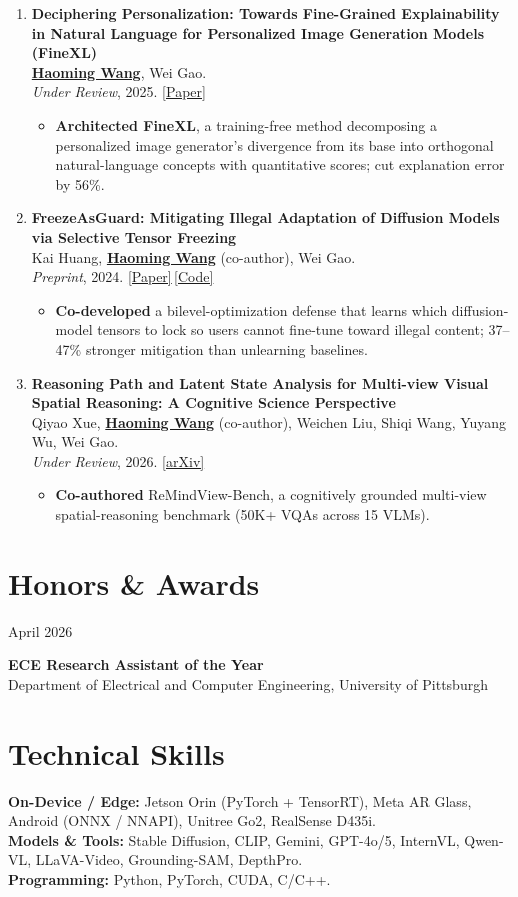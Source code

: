 \documentclass[11pt, letterpaper]{article}
\newenvironment{datedentry}[1]{%
  \par\noindent
  \begin{minipage}[t]{2.8cm}\raggedright\small #1\end{minipage}%
  \hspace{0.3cm}%
  \begin{minipage}[t]{\dimexpr\linewidth-3.1cm\relax}\raggedright
}{\end{minipage}\par\medskip}
\newenvironment{publist}{
  \begin{enumerate}[leftmargin=1.7em, itemsep=4pt, parsep=0pt, topsep=2pt, label=\arabic*.]
}{\end{enumerate}}
\newcommand{\impactbullet}[1]{%
  \par\vspace{1pt}%
  \begin{itemize}[leftmargin=1.2em, topsep=0pt, itemsep=0pt, parsep=0pt, partopsep=0pt]
    \item #1
  \end{itemize}}
\newcommand{\me}{\underline{\textbf{Haoming Wang}}}
\newcommand{\meco}{\underline{\textbf{Haoming Wang}} (co-author)}
\begin{document}
\begin{publist}
\item \textbf{Deciphering Personalization: Towards Fine-Grained Explainability in Natural Language for Personalized Image Generation Models (FineXL)}\\
\me, Wei Gao.\\
\textit{Under Review}, 2025. \href{https://haomingwang645.github.io/pdfs/finexl_paper.pdf}{[Paper]}
\impactbullet{\textbf{Architected FineXL}, a training-free method decomposing a personalized image generator's divergence from its base into orthogonal natural-language concepts with quantitative scores; cut explanation error by 56\%.}

\item \textbf{FreezeAsGuard: Mitigating Illegal Adaptation of Diffusion Models via Selective Tensor Freezing}\\
Kai Huang, \meco, Wei Gao.\\
\textit{Preprint}, 2024. \href{https://haomingwang645.github.io/pdfs/freezeasguard_paper.pdf}{[Paper]}\,\href{https://github.com/pittisl/FreezeAsGuard}{[Code]}
\impactbullet{\textbf{Co-developed} a bilevel-optimization defense that learns which diffusion-model tensors to lock so users cannot fine-tune toward illegal content; 37--47\% stronger mitigation than unlearning baselines.}

\item \textbf{Reasoning Path and Latent State Analysis for Multi-view Visual Spatial Reasoning: A Cognitive Science Perspective}\\
Qiyao Xue, \meco, Weichen Liu, Shiqi Wang, Yuyang Wu, Wei Gao.\\
\textit{Under Review}, 2026. \href{https://arxiv.org/abs/2512.02340}{[arXiv]}
\impactbullet{\textbf{Co-authored} ReMindView-Bench, a cognitively grounded multi-view spatial-reasoning benchmark (50K+ VQAs across 15 VLMs).}
\end{publist}

\section{Honors \& Awards}

\begin{datedentry}{April 2026}
\textbf{ECE Research Assistant of the Year}\\
Department of Electrical and Computer Engineering, University of Pittsburgh
\end{datedentry}

\section{Technical Skills}
\textbf{On-Device / Edge:} Jetson Orin (PyTorch + TensorRT), Meta AR Glass, Android (ONNX / NNAPI), Unitree Go2, RealSense D435i.\\[2pt]
\textbf{Models \& Tools:} Stable Diffusion, CLIP, Gemini, GPT-4o/5, InternVL, Qwen-VL, LLaVA-Video, Grounding-SAM, DepthPro.\\[2pt]
\textbf{Programming:} Python, PyTorch, CUDA, C/C++.
\end{document}
